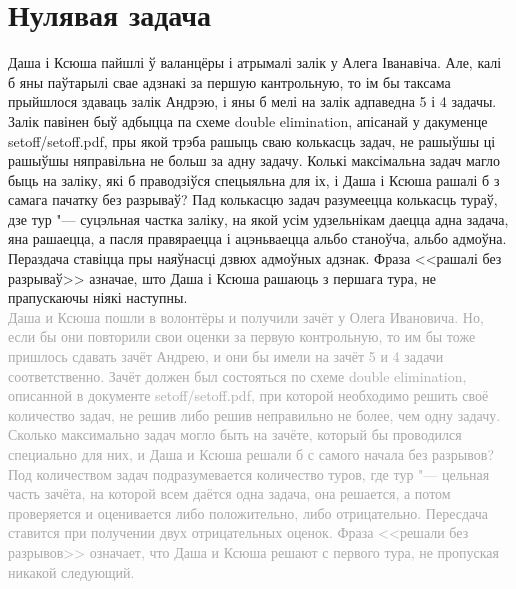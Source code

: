 \documentclass[12pt, a4paper]{extarticle}
\begin{document}
    \section{Нулявая задача}
    \noindent Даша і Ксюша пайшлі ў валанцёры і атрымалі залік у Алега Іванавіча. Але, калі б яны паўтарылі свае адзнакі за першую кантрольную, то ім бы таксама прыйшлося здаваць залік Андрэю, і яны б мелі на залік адпаведна 5 і 4 задачы. Залік павінен быў адбыцца па схеме double elimination, апісанай у дакуменце setoff/setoff.pdf, пры якой трэба рашыць сваю колькасць задач, не рашыўшы ці рашыўшы няправільна не больш за адну задачу. Колькі максімальна задач магло быць на заліку, які б праводзіўся спецыяльна для іх, і Даша і Ксюша рашалі б з самага пачатку без разрываў? Пад колькасцю задач разумеецца колькасць тураў, дзе тур "--- суцэльная частка заліку, на якой усім удзельнікам даецца адна задача, яна рашаецца, а пасля правяраецца і ацэньваецца альбо станоўча, альбо адмоўна. Пераздача ставіцца пры наяўнасці дзвюх адмоўных адзнак. Фраза <<рашалі без разрываў>> азначае, што Даша і Ксюша рашаюць з першага тура, не прапускаючы ніякі наступны. \\
    {\footnotesize \textcolor{darkgray}{Даша и Ксюша пошли в волонтёры и получили зачёт у Олега Ивановича. Но, если бы они повторили свои оценки за первую контрольную, то им бы тоже пришлось сдавать зачёт Андрею, и они бы имели на зачёт 5 и 4 задачи соответственно. Зачёт должен был состояться по схеме double elimination, описанной в  документе setoff/setoff.pdf, при которой необходимо решить своё количество задач, не решив либо решив неправильно не более, чем одну задачу. Сколько максимально задач могло быть на зачёте, который бы проводился специально для них, и Даша и Ксюша решали б с самого начала без разрывов? Под количеством задач подразумевается количество туров, где тур "--- цельная часть зачёта, на которой всем даётся одна задача, она решается, а потом проверяется и оценивается либо положительно, либо отрицательно. Пересдача ставится при получении двух отрицательных оценок. Фраза <<решали без разрывов>> означает, что Даша и Ксюша решают с первого тура, не пропуская никакой следующий.}}
\end{document}
